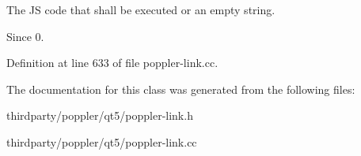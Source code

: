 The JS code that shall be executed or an empty string.

\begin{DoxySince}{Since}
0. 
\end{DoxySince}


Definition at line 633 of file poppler-\/link.\+cc.



The documentation for this class was generated from the following files\+:\begin{DoxyCompactItemize}
\item 
thirdparty/poppler/qt5/poppler-\/link.\+h\item 
thirdparty/poppler/qt5/poppler-\/link.\+cc\end{DoxyCompactItemize}

